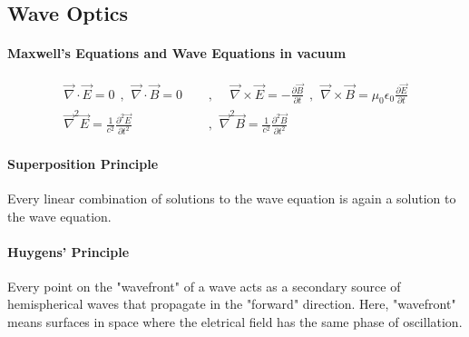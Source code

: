 \subsection{Wave Optics}

\paragraph{Maxwell's Equations and Wave Equations in vacuum}
\begin{align*}
    \vec{\nabla} \cdot \vec{E} = 0
    \hspace{5pt} , \hspace{5pt}
    \vec{\nabla} \cdot \vec{B} = 0
    \hspace{15pt} &, \hspace{15pt}
    \vec{\nabla} \times \vec{E} = - \frac{\partial \vec{B}}{\partial t}
    \hspace{5pt} , \hspace{5pt}
    \vec{\nabla} \times \vec{B} = \mu_0 \epsilon_0 \frac{\partial \vec{E}}{\partial t}
    \\
    \vec{\nabla}^2 \vec{E} = \frac{1}{c^2} \frac{\partial^2 \vec{E}}{\partial t^2}
    \hspace{5pt} &, \hspace{5pt}
    \vec{\nabla}^2 \vec{B} = \frac{1}{c^2} \frac{\partial^2 \vec{B}}{\partial t^2}
\end{align*}

\paragraph{Superposition Principle}
Every linear combination of solutions to the wave equation is again a solution
to the wave equation.

\paragraph{Huygens' Principle}
Every point on the "wavefront" of a wave acts as a secondary source of hemispherical
waves that propagate in the "forward" direction. Here, "wavefront" means surfaces
in space where the eletrical field has the same phase of oscillation.

\vspace{1\baselineskip}

